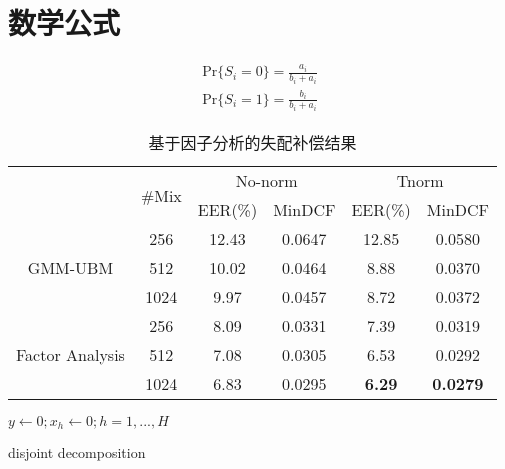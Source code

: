 ﻿
\chapter{数学公式}
\label{chap:math}
\begin{equation}
\begin{split}
\mbox{Pr}\{S_i=0\}=\frac{a_i}{b_i+a_i} \\
\mbox{Pr}\{S_i=1\}=\frac{b_i}{b_i+a_i} \label{1}
\end{split}
\end{equation}\cite{lshort-cn}



\begin{table}[htbp]
\centering
\caption{基于因子分析的失配补偿结果}\label{tab:jfa-gmm-ubm}
\begin{tabular}{cccccc}
    \toprule
    &\multirow{2}{*}{\#Mix}&\multicolumn{2}{c}{No-norm}
    &\multicolumn{2}{c}{Tnorm}\\
    \cline{3-4} \cline{5-6}
		&		& EER(\%) 	& MinDCF & EER(\%) 	& MinDCF\\
    \midrule
	\multirow{3}{*}{GMM-UBM}
    &256 		& 12.43 	& 0.0647	& 12.85    & 0.0580\\
    &512 		& 10.02 	& 0.0464	& 8.88 	   & 0.0370\\
    &1024 		& 9.97 	    & 0.0457	& 8.72 	   & 0.0372\\
    \midrule
	\multirow{3}{*}{Factor Analysis}
    &256 		& 8.09 	& 0.0331 	& 7.39 	& 0.0319\\
    &512 		& 7.08 	& 0.0305 	& 6.53 	& 0.0292\\
    &1024 		& 6.83 	& 0.0295 	& \textbf{6.29} 	& \textbf{0.0279}\\
 \bottomrule
\end{tabular}
\end{table}



\IncMargin{1em}
\begin{algorithm}
\BlankLine
\emph{$y\leftarrow 0;$$x_h\leftarrow 0;$$h=1,...,H$ }\;
\caption{disjoint decomposition}\label{algo_disjdecomp}
\end{algorithm}\DecMargin{1em}